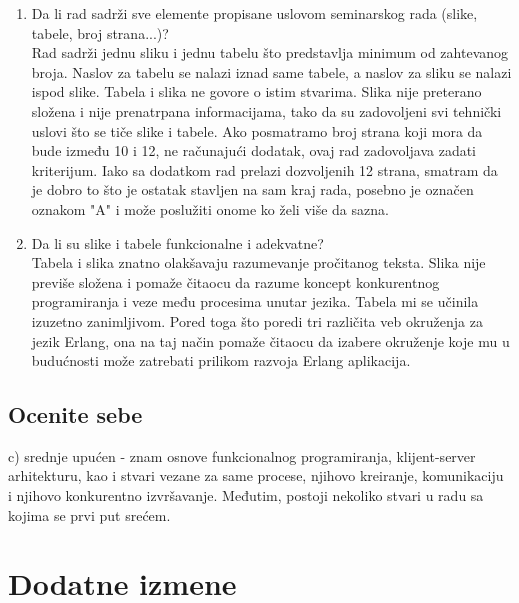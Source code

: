 \documentclass[a4paper]{report}
\begin{document}
\begin{enumerate}
\item Da li rad sadrži sve elemente propisane uslovom seminarskog rada (slike, tabele, broj strana...)?\\
Rad sadrži jednu sliku i jednu tabelu što predstavlja minimum od zahtevanog broja. Naslov za tabelu se nalazi iznad same tabele, a naslov za sliku se nalazi ispod slike. Tabela i slika ne govore o istim stvarima. Slika nije preterano složena i nije prenatrpana informacijama, tako da su zadovoljeni svi tehnički uslovi što se tiče slike i tabele. Ako posmatramo broj strana koji mora da bude između 10 i 12, ne računajući dodatak, ovaj rad zadovoljava zadati kriterijum. Iako sa dodatkom rad prelazi dozvoljenih 12 strana, smatram da je dobro to što je ostatak stavljen na sam kraj rada, posebno je označen oznakom "A" i može poslužiti onome ko želi više da sazna.


\item Da li su slike i tabele funkcionalne i adekvatne?\\
Tabela i slika znatno olakšavaju razumevanje pročitanog teksta. Slika nije previše složena i pomaže čitaocu da razume koncept konkurentnog programiranja i veze među procesima unutar jezika. Tabela mi se učinila izuzetno zanimljivom. Pored toga što poredi tri različita veb okruženja za jezik Erlang, ona na taj način pomaže čitaocu da izabere okruženje koje mu u budućnosti može zatrebati prilikom razvoja Erlang aplikacija.


\end{enumerate}

\section{Ocenite sebe}
c) srednje upućen - znam osnove funkcionalnog programiranja, klijent-server arhitekturu, kao i stvari vezane za same procese, njihovo kreiranje, komunikaciju i njihovo konkurentno izvršavanje. Međutim, postoji nekoliko stvari u radu sa kojima se prvi put srećem.


\chapter{Dodatne izmene}
\end{document}
